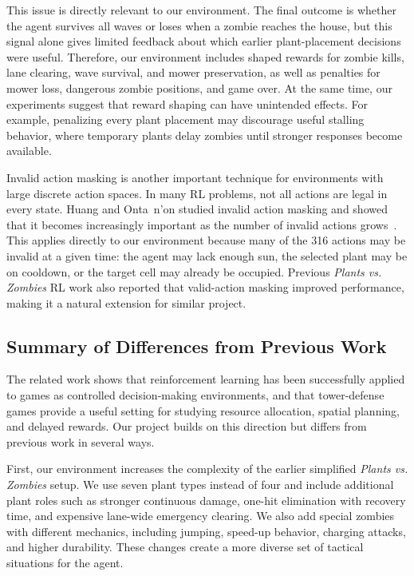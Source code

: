 \documentclass[conference,onecolumn]{IEEEtran}
\begin{document}
This issue is directly relevant to our environment. The final outcome is whether the agent survives all waves or loses when a zombie reaches the house, but this signal alone gives limited feedback about which earlier plant-placement decisions were useful. Therefore, our environment includes shaped rewards for zombie kills, lane clearing, wave survival, and mower preservation, as well as penalties for mower loss, dangerous zombie positions, and game over. At the same time, our experiments suggest that reward shaping can have unintended effects. For example, penalizing every plant placement may discourage useful stalling behavior, where temporary plants delay zombies until stronger responses become available.

Invalid action masking is another important technique for environments with large discrete action spaces. In many RL problems, not all actions are legal in every state. Huang and Onta{~n}{'o}n studied invalid action masking and showed that it becomes increasingly important as the number of invalid actions grows~\cite{huang2022closer}. This applies directly to our environment because many of the 316 actions may be invalid at a given time: the agent may lack enough sun, the selected plant may be on cooldown, or the target cell may already be occupied. Previous \textit{Plants vs. Zombies} RL work also reported that valid-action masking improved performance, making it a natural extension for similar project.

\subsection{Summary of Differences from Previous Work}

The related work shows that reinforcement learning has been successfully applied to games as controlled decision-making environments, and that tower-defense games provide a useful setting for studying resource allocation, spatial planning, and delayed rewards. Our project builds on this direction but differs from previous work in several ways.

First, our environment increases the complexity of the earlier simplified \textit{Plants vs. Zombies} setup. We use seven plant types instead of four and include additional plant roles such as stronger continuous damage, one-hit elimination with recovery time, and expensive lane-wide emergency clearing. We also add special zombies with different mechanics, including jumping, speed-up behavior, charging attacks, and higher durability. These changes create a more diverse set of tactical situations for the agent. 
\end{document}
